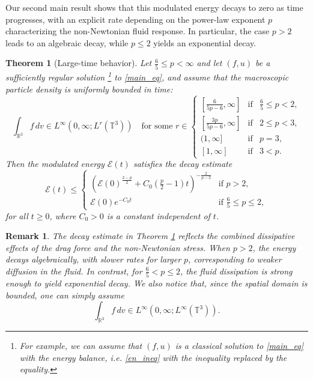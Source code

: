 \documentclass[10pt,reqno]{amsart}
\numberwithin{equation}{section}
\newtheorem{theorem}{Theorem}[section]
\newtheorem{remark}{Remark}[section]
\newcommand{\R}{\mathbb R}
\newcommand{\T}{\mathbb T}
\newcommand{\bq}{\begin{equation}}
\newcommand{\eq}{\end{equation}}
\newcommand{\calE}{\mathcal{E}}
\begin{document}
Our second main result shows that this modulated energy decays to zero as time progresses, with an explicit rate depending on the power-law exponent $p$ characterizing the non-Newtonian fluid response. In particular, the case $p > 2$ leads to an algebraic decay, while $p \le 2$ yields an exponential decay.
\begin{theorem}[Large-time behavior]\label{thm_main2}
Let $\frac65 \leq p < \infty$ and let $(f,u)$ be a sufficiently regular solution \footnote{For example, we can assume that $(f,u)$ is a classical solution to \eqref{main_eq} with the energy balance, i.e. \eqref{en_ineq} with the inequality replaced by the equality.} to \eqref{main_eq}, and assume that the macroscopic particle density is uniformly bounded in time:
\bq\label{condi_large}
\int_{\R^3} f\,dv \in L^\infty(0,\infty; L^r(\T^3)) \quad  \mbox{for some }  r \in \left\{\begin{array}{lcl} %
 [\frac{6}{5p-6}, \infty] &\mbox{if}& \frac65 \leq p <2, \\[2mm]
 [\frac{3p}{5p-6}, \infty] &\mbox{if}& 2\le p<3, \\[2mm]
 (1, \infty] &\mbox{if} & p=3, \\[2mm]
 [1,\infty] & \mbox{if} & 3<p.   \end{array} \right.
\eq
Then the modulated energy $\mathcal{E}(t)$ satisfies the decay estimate
\[
\calE(t) 
\leq \begin{cases}
\left(\calE(0)^{\frac{2-p}{2}} + C_0 \left(\frac p2 - 1 \right) t \right)^{-\frac2{p-2}} & \text{if } p>2,\\[2mm]
\calE(0)e^{-C_0 t} & \text{if } \frac65 \le p \le 2,
\end{cases}
\]
for all $t \geq 0$, where $C_0 > 0$ is a constant independent of $t$.
\end{theorem}


\begin{remark}
The decay estimate in Theorem \ref{thm_main2} reflects the combined dissipative effects of the drag force and the non-Newtonian stress. When  $p > 2$, the energy decays algebraically, with slower rates for larger  $p$, corresponding to weaker diffusion in the fluid. In contrast, for  $\frac{6}{5} < p \le 2 $, the fluid dissipation is strong enough to yield exponential decay. We also notice that, since the spatial domain is bounded, one can simply assume 
\[
\int_{\R^3} f\,dv \in L^\infty(0,\infty; L^\infty(\T^3)).
\]
\end{remark}
\end{document}
